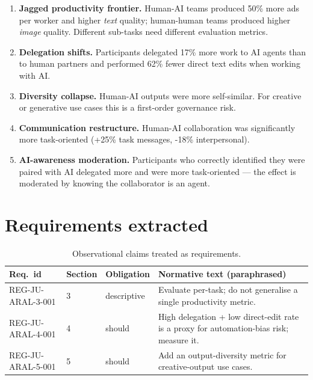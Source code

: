 \begin{enumerate}
  \item \textbf{Jagged productivity frontier.} Human-AI teams produced
        50\% more ads per worker and higher \emph{text} quality;
        human-human teams produced higher \emph{image} quality. Different
        sub-tasks need different evaluation metrics.
  \item \textbf{Delegation shifts.} Participants delegated 17\% more work
        to AI agents than to human partners and performed 62\% fewer
        direct text edits when working with AI.
  \item \textbf{Diversity collapse.} Human-AI outputs were more
        self-similar. For creative or generative use cases this is a
        first-order governance risk.
  \item \textbf{Communication restructure.} Human-AI collaboration was
        significantly more task-oriented (+25\% task messages, -18\%
        interpersonal).
  \item \textbf{AI-awareness moderation.} Participants who correctly
        identified they were paired with AI delegated more and were more
        task-oriented --- the effect is moderated by knowing the
        collaborator is an agent.
\end{enumerate}

\section{Requirements extracted}

\begin{table}[h]
\centering
\small
\begin{tabularx}{\textwidth}{p{3.2cm}p{1.4cm}p{1.6cm}X}
\toprule
\textbf{Req.\ id} & \textbf{Section} & \textbf{Obligation} & \textbf{Normative text (paraphrased)} \\
\midrule
REG-JU-ARAL-3-001 & 3 & descriptive & Evaluate per-task; do not generalise a single productivity metric. \\
REG-JU-ARAL-4-001 & 4 & should & High delegation + low direct-edit rate is a proxy for automation-bias risk; measure it. \\
REG-JU-ARAL-5-001 & 5 & should & Add an output-diversity metric for creative-output use cases. \\
\bottomrule
\end{tabularx}
\caption{Observational claims treated as requirements.}
\label{tab:jural-reqs}
\end{table}

